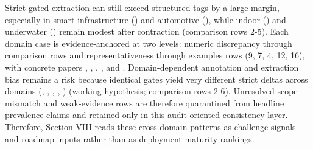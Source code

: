 \markdownRendererUlItem Strict-gated extraction can still exceed structured tags by a large margin, especially in smart infrastructure () and automotive (), while indoor () and underwater () remain modest after contraction (comparison rows \markdownRendererHash{}2-\markdownRendererHash{}5).\markdownRendererUlItemEnd 
\markdownRendererUlItem Each domain case is evidence-anchored at two levels: numeric discrepancy through comparison rows and representativeness through examples rows (\markdownRendererHash{}9, \markdownRendererHash{}7, \markdownRendererHash{}4, \markdownRendererHash{}12, \markdownRendererHash{}16), with concrete papers , , , , and .\markdownRendererUlItemEnd 
\markdownRendererUlItem Domain-dependent annotation and extraction bias remains a risk because identical gates yield very different strict deltas across domains (, , , , ) (working hypothesis; comparison rows \markdownRendererHash{}2-\markdownRendererHash{}6).\markdownRendererUlItemEnd 
\markdownRendererUlItem Unresolved scope-mismatch and weak-evidence rows are therefore quarantined from headline prevalence claims and retained only in this audit-oriented consistency layer.\markdownRendererUlItemEnd 
\markdownRendererUlEndTight \markdownRendererInterblockSeparator
{}Therefore, Section VIII reads these cross-domain patterns as challenge signals and roadmap inputs rather than as deployment-maturity rankings.\markdownRendererInterblockSeparator
{}
\markdownRendererSectionEnd 
\markdownRendererSectionEnd 
\markdownRendererSectionEnd 
\markdownRendererSectionEnd \markdownRendererSectionBegin
{}\markdownRendererInterblockSeparator
